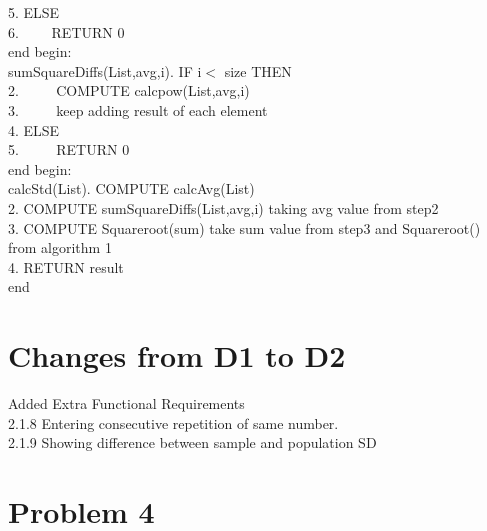 \documentclass[a4paper,12pt]{article}
\begin{document}
\begin{titlepage}
\begin{algorithm}
5. ELSE\\
6. $\hspace{2em}$RETURN 0\\
end\newline
begin:\\
sumSquareDiffs(List,avg,i). IF i$<$ size THEN\\
2. $\hspace{2em}$ COMPUTE calcpow(List,avg,i) \\
3. $\hspace{2em}$ keep adding result of each element\\
4. ELSE\\
5. $\hspace{2em}$ RETURN 0\\
end\newline
begin:\\
calcStd(List). COMPUTE calcAvg(List)\\
2. COMPUTE sumSquareDiffs(List,avg,i) taking avg value from step2\\
3. COMPUTE Squareroot(sum) take sum value from step3 and Squareroot() from algorithm 1\\
4. RETURN result\\
end\newline
\end{algorithm}
\newpage

\section{Changes from D1 to D2}
Added Extra Functional Requirements\\
2.1.8 Entering consecutive repetition of same number.\\
2.1.9 Showing difference between  sample and population SD

\section{Problem 4} 

\end{titlepage}
\end{document}
